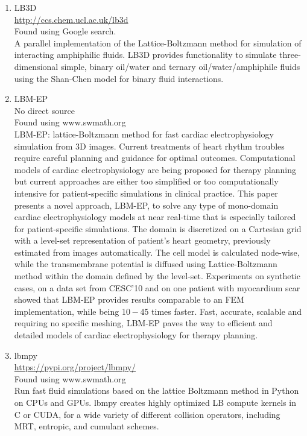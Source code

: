 \documentclass{article}
\begin{document}
\begin{enumerate}
\item LB3D \\ 
\href{http://ccs.chem.ucl.ac.uk/lb3d}{http://ccs.chem.ucl.ac.uk/lb3d}
\\
Found using Google search.\\
A parallel implementation of the Lattice-Boltzmann method for simulation of interacting amphiphilic fluids. LB3D provides functionality to simulate three-dimensional simple, binary oil/water and ternary oil/water/amphiphile fluids using the Shan-Chen model for binary fluid interactions.

\item LBM-EP \\
No direct source\\
Found using www.swmath.org \\	
LBM-EP: lattice-Boltzmann method for fast cardiac electrophysiology simulation from 3D images. Current treatments of heart rhythm troubles require careful planning and guidance for optimal outcomes. Computational models of cardiac electrophysiology are being proposed for therapy planning but current approaches are either too simplified or too computationally intensive for patient-specific simulations in clinical practice. This paper presents a novel approach, LBM-EP, to solve any type of mono-domain cardiac electrophysiology models at near real-time that is especially tailored for patient-specific simulations. The domain is discretized on a Cartesian grid with a level-set representation of patient’s heart geometry, previously estimated from images automatically. The cell model is calculated node-wise, while the transmembrane potential is diffused using Lattice-Boltzmann method within the domain defined by the level-set. Experiments on synthetic cases, on a data set from CESC’10 and on one patient with myocardium scar showed that LBM-EP provides results comparable to an FEM implementation, while being 10 − 45 times faster. Fast, accurate, scalable and requiring no specific meshing, LBM-EP paves the way to efficient and detailed models of cardiac electrophysiology for therapy planning. 

\item lbmpy \\
\href{https://pypi.org/project/lbmpy/}{https://pypi.org/project/lbmpy/}\\
Found using www.swmath.org \\
Run fast fluid simulations based on the lattice Boltzmann method in Python on CPUs and GPUs. lbmpy creates highly optimized LB compute kernels in C or CUDA, for a wide variety of different collision operators, including MRT, entropic, and cumulant schemes.


\end{enumerate}
\end{document}
